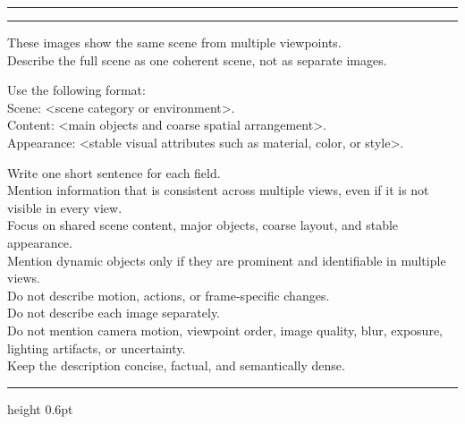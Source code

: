 {
  \vspace{1em}
  \color{linegreen}
  \hrule
  \vspace{1pt}
  \hrule
  \vspace{0.5em}
}

\begingroup

\color{promptcolor} \ttfamily \footnotesize \raggedright
{}

\vspace{0.25em}
\noindent
These images show the same scene from multiple viewpoints.\\
Describe the full scene as one coherent scene, not as separate images.\par\vspace{0.5em}\noindent
Use the following format:\\
Scene: \textless{}scene category or environment\textgreater{}.\\
Content: \textless{}main objects and coarse spatial arrangement\textgreater{}.\\
Appearance: \textless{}stable visual attributes such as material, color, or style\textgreater{}.\par\vspace{0.5em}\noindent
Write one short sentence for each field.\\
Mention information that is consistent across multiple views, even if it is not visible in every view.\\
Focus on shared scene content, major objects, coarse layout, and stable appearance.\\
Mention dynamic objects only if they are prominent and identifiable in multiple views.\\
Do not describe motion, actions, or frame-specific changes.\\
Do not describe each image separately.\\
Do not mention camera motion, viewpoint order, image quality, blur, exposure, lighting artifacts, or uncertainty.\\
Keep the description concise, factual, and semantically dense.

\vspace{0.7em}
{\color{linegreen}\hrule height 0.6pt}
\vspace{0.6em}
\vspace{-0.6em}
\newcommand{\exampleDashedSep}{\par\vspace{0.4em}\noindent{\color{linegreen}\leaders\hbox{\rule{0.8em}{0.4pt}\hspace{0.35em}}\hfill\kern0pt}\par\vspace{0.4em}}

